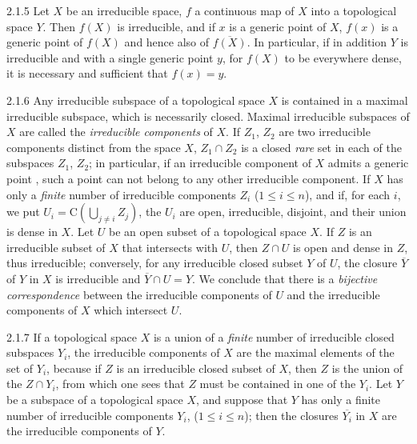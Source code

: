 \begin{env}{2.1.5}
\label{env-0.2.1.5}
Let $X$ be an irreducible space, $f$ a continuous map of $X$ into a topological
space $Y$. Then $f(X)$ is irreducible, and if $x$ is a generic point of $X$,
$f(x)$ is a generic point of $f(X)$ and hence also of $\overline{f(X)}$. In
particular, if in addition $Y$ is irreducible and with a single generic point
$y$, for $f(X)$ to be everywhere dense, it is necessary and sufficient that
$f(x)=y$.
\end{env}

\begin{env}{2.1.6}
\label{env-0.2.1.6}
Any irreducible subspace of a topological space $X$ is contained in a maximal
irreducible subspace, which is necessarily closed. Maximal irreducible subspaces
of $X$ are called the \emph{irreducible components} of $X$. If $Z_1$, $Z_2$ are
two irreducible components distinct from the space $X$, $Z_1\cap Z_2$ is a
closed \emph{rare} set in each of the subspaces $Z_1$, $Z_2$; in particular, if
an irreducible component of $X$ admits a generic point , such a
point can not belong to any other irreducible component. If $X$ has only a
\emph{finite} number of irreducible components $Z_i$
($1\leqslant i\leqslant n$), and if, for each $i$, we put
$U_i=\mathrm{C}(\bigcup_{j\neq i}Z_j)$, the $U_i$ are open, irreducible,
disjoint, and their union is dense in $X$. Let $U$ be an open subset of a
topological space $X$. If $Z$ is an irreducible subset of $X$ that intersects
with $U$, then $Z\cap U$ is open and dense in $Z$, thus irreducible; conversely,
for any irreducible closed subset $Y$ of $U$, the closure $\overline{Y}$ of $Y$
in $X$ is irreducible and $\overline{Y}\cap U=Y$. We conclude that there is a
\emph{bijective correspondence} between the irreducible components of $U$ and
the irreducible components of $X$ which intersect $U$.
\end{env}

\begin{env}{2.1.7}
\label{env-0.2.1.7}
If a topological space $X$ is a union of a \emph{finite} number of irreducible
closed subspaces $Y_i$, the irreducible components of $X$ are the maximal
elements of the set of $Y_i$, because if $Z$ is an irreducible closed subset of
$X$, then $Z$ is the union of the $Z\cap Y_i$, from which one sees that $Z$ must
be contained in one of the $Y_i$. Let $Y$ be a subspace of a topological space
$X$, and suppose that $Y$ has only a finite number of irreducible components
$Y_i$, ($1\leqslant i\leqslant n$); then the closures $\overline{Y_i}$ in $X$
are the irreducible components of $Y$.
\end{env}

